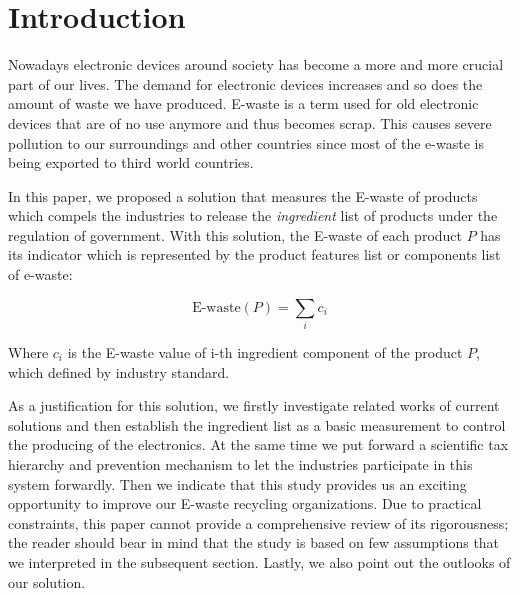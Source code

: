 \section{Introduction}

Nowadays electronic devices around society has become a more and more crucial part of our lives. 
The demand for electronic devices increases and so does the amount of waste we have produced. 
E-waste is a term used for old electronic devices that are of no use anymore and thus becomes scrap. 
This causes severe pollution to our surroundings and other countries since most of the e-waste 
is being exported to third world countries.

In this paper, we proposed a solution that measures the E-waste of products which
compels the industries to release the \emph{ingredient} list of products under the regulation of government.
With this solution, the E-waste of each product $P$ has its indicator which is represented by 
the product features list or components list of e-waste:

\[
\text{E-waste}(P) = \sum_{i}{c_{i}}
\]

Where $c_{i}$ is the E-waste value of i-th ingredient component of the product $P$, 
which defined by industry standard. 

As a justification for this solution, we firstly 
investigate related works of current solutions and then establish the ingredient list as
a basic measurement to control the producing of the electronics. At the same time we put forward 
a scientific tax hierarchy and prevention mechanism to let the industries participate in this system forwardly.
Then we indicate that this study provides us an exciting opportunity to improve our E-waste recycling organizations.
Due to practical constraints, this paper cannot provide a comprehensive review of its 
rigorousness; the reader should bear in mind that the study is based on few assumptions that 
we interpreted in the subsequent section. Lastly, we also point out the outlooks of our solution.